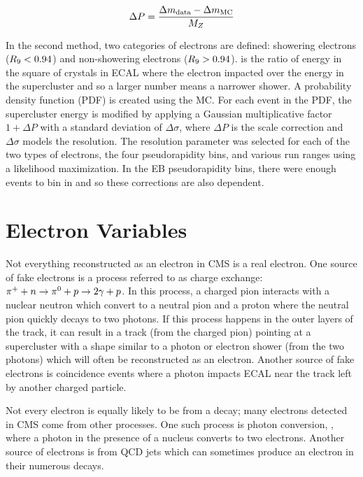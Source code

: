 \begin{equation} \label{eq:scale_correction}
    \Delta P = \frac{\Delta m_{\text{data}} - \Delta m_{\text{MC}}}{M_{Z}}
\end{equation}

In the second method, two categories of electrons are defined: showering
electrons ($R_{9} < 0.94$) and non-showering electrons ($R_{9} > 0.94$).
\RNine is the ratio of energy in the \threebythree square of crystals in ECAL
where the electron impacted over the energy in the supercluster and so a larger
number means a narrower shower. A probability density function (PDF) is created
using the \Ztoee MC. For each event in the PDF, the supercluster energy is
modified by applying a Gaussian multiplicative factor $1+\Delta P$ with a
standard deviation of $\Delta \sigma$, where $\Delta P$ is the scale correction
and $\Delta \sigma$ models the resolution. The resolution parameter was
selected for each of the two types of electrons, the four pseudorapidity bins,
and various run ranges using a likelihood maximization. In the EB
pseudorapidity bins, there were enough events to bin in \ET and so these
corrections are also \ET dependent.

\section{Electron Variables}
\label{sec:electron_variables}

Not everything reconstructed as an electron in CMS is a real electron. One
source of fake electrons is a process referred to as charge exchange:
$\pi^{+} + n \to \pi^{0} + p \to 2 \gamma + p$. In this process, a charged pion
interacts with a nuclear neutron which convert to a neutral pion and a proton
where the neutral pion quickly decays to two photons. If this process happens
in the outer layers of the track, it can result in a track (from the charged
pion) pointing at a supercluster with a shape similar to a photon or electron
shower (from the two photons) which will often be reconstructed as an electron.
Another source of fake electrons is coincidence events where a photon impacts
ECAL near the track left by another charged particle.

Not every electron is equally likely to be from a \Ztoee decay; many electrons
detected in CMS come from other processes. One such process is photon
conversion, \PhotonConversion, where a photon in the presence of a nucleus
converts to two electrons. Another source of electrons is from QCD jets which
can sometimes produce an electron in their numerous decays.

